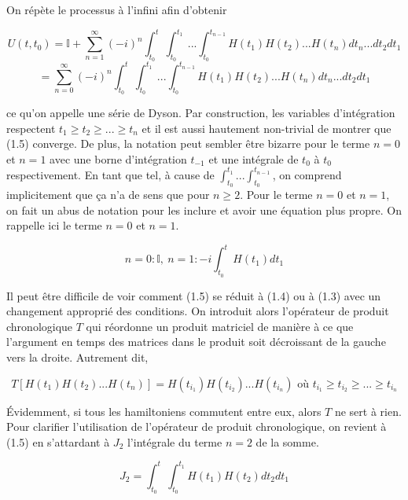 On répète le processus à l'infini afin d'obtenir

\begin{equation*}
    U(t,t_0) = \mathbb{I} + \sum_{n=1}^{\infty}(-i)^n \int_{t_0}^{t}\int_{t_0}^{t_1} \ ... \int_{t_0}^{t_{n-1}}H(t_1)H(t_2) ... H(t_n)dt_n ... dt_2 dt_1 
\end{equation*}
\begin{equation}
    = \sum_{n=0}^{\infty}(-i)^n \int_{t_0}^{t}\int_{t_0}^{t_1} \ ... \int_{t_0}^{t_{n-1}}H(t_1)H(t_2) ... H(t_n)dt_n ... dt_2 dt_1  
\end{equation}

ce qu'on appelle une série de Dyson. Par construction, les variables d'intégration respectent $t_1 \geq t_2 \geq ... \geq t_n$ et il est aussi hautement non-trivial de montrer que (1.5) converge. De plus, la notation peut sembler être bizarre pour le terme $n=0$ et $n=1$ avec une borne d'intégration $t_{-1}$ et une intégrale de $t_0$ à $t_0$ respectivement. En tant que tel, à cause de $\int_{t_0}^{t_1} ... \int_{t_0}^{t_{n-1}}$, on comprend implicitement que ça n'a de sens que pour $n\geq2$. Pour le terme $n=0$ et $n=1$, on fait un abus de notation pour les inclure et avoir une équation plus propre. On rappelle ici le terme $n=0$ et $n=1$.

\begin{equation*}
    n=0 : \mathbb{I}, \ n=1 : -i\int_{t_0}^{t}H(t_1)dt_1
\end{equation*}

Il peut être difficile de voir comment (1.5) se réduit à (1.4) ou à (1.3) avec un changement approprié des conditions. On introduit alors l'opérateur de produit chronologique $T$ qui réordonne un produit matriciel de manière à ce que l'argument en temps des matrices dans le produit soit décroissant de la gauche vers la droite. Autrement dit,

\begin{equation}
    T[H(t_1)H(t_2)...H(t_n)] = H(t_{i_1})H(t_{i_2})...H(t_{i_n}) \text{ où } t_{i_1} \geq t_{i_2} \geq ... \geq t_{i_n}
\end{equation}

Évidemment, si tous les hamiltoniens commutent entre eux, alors $T$ ne sert à rien. Pour clarifier l'utilisation de l'opérateur de produit chronologique, on revient à (1.5) en s'attardant à $J_2$ l'intégrale du terme $n=2$ de la somme.

\begin{equation*}
    J_2 = \int_{t_0}^{t}\int_{t_0}^{t_1}H(t_1)H(t_2)dt_2dt_1 
\end{equation*}

